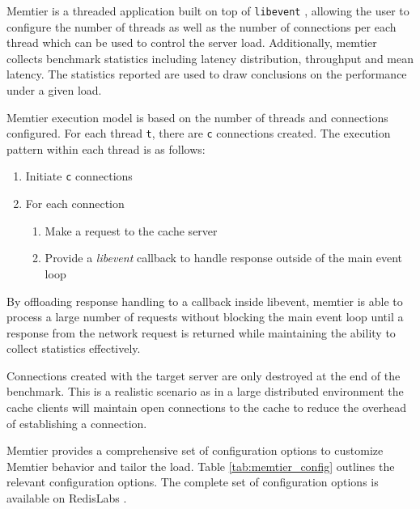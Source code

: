 Memtier is a threaded application built on top of \texttt{libevent} \cite{libevent}, allowing the user to configure the number of threads as well as the number of connections per each thread which can be used to control the server load. Additionally, memtier collects benchmark statistics including latency distribution, throughput and mean latency. The statistics reported are used to draw conclusions on the performance under a given load.

Memtier execution model is based on the number of threads and connections configured. For each thread \texttt{t}, there are \texttt{c} connections created. The execution pattern within each thread is as follows:

\begin{enumerate}
    \item Initiate \texttt{c} connections
    \item For each connection
        \begin{enumerate}
            \item Make a request to the cache server
            \item Provide a \textit{libevent} callback to handle response outside of the main event loop
        \end{enumerate}
\end{enumerate}

By offloading response handling to a callback inside libevent, memtier is able to process a large number of requests without blocking the main event loop until a response from the network request is returned while maintaining the ability to collect statistics effectively.

Connections created with the target server are only destroyed at the end of the benchmark. This is a realistic scenario as in a large distributed environment the cache clients will maintain open connections to the cache to reduce the overhead of establishing a connection.

Memtier provides a comprehensive set of configuration options to customize Memtier behavior and tailor the load. Table \ref{tab:memtier_config} outlines the relevant configuration options. The complete set of configuration options is available on RedisLabs \cite{MemtierConfiguration}.

